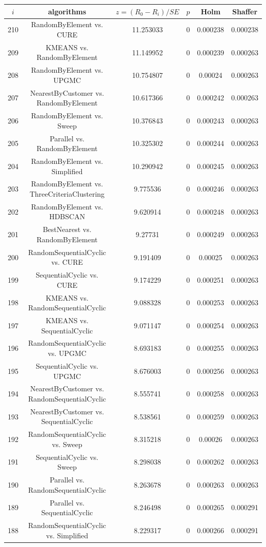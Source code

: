 \documentclass[a4paper,10pt]{article}
\begin{document}
\begin{landscape}
\begin{table}[!htp]
\centering\scriptsize
\begin{tabular}{cccccc}
$i$&algorithms&$z=(R_0 - R_i)/SE$&$p$&Holm&Shaffer\\
\hline210&RandomByElement vs. CURE&11.253033&0&0.000238&0.000238\\
209&KMEANS vs. RandomByElement&11.149952&0&0.000239&0.000263\\
208&RandomByElement vs. UPGMC&10.754807&0&0.00024&0.000263\\
207&NearestByCustomer vs. RandomByElement&10.617366&0&0.000242&0.000263\\
206&RandomByElement vs. Sweep&10.376843&0&0.000243&0.000263\\
205&Parallel vs. RandomByElement&10.325302&0&0.000244&0.000263\\
204&RandomByElement vs. Simplified&10.290942&0&0.000245&0.000263\\
203&RandomByElement vs. ThreeCriteriaClustering&9.775536&0&0.000246&0.000263\\
202&RandomByElement vs. HDBSCAN&9.620914&0&0.000248&0.000263\\
201&BestNearest vs. RandomByElement&9.27731&0&0.000249&0.000263\\
200&RandomSequentialCyclic vs. CURE&9.191409&0&0.00025&0.000263\\
199&SequentialCyclic vs. CURE&9.174229&0&0.000251&0.000263\\
198&KMEANS vs. RandomSequentialCyclic&9.088328&0&0.000253&0.000263\\
197&KMEANS vs. SequentialCyclic&9.071147&0&0.000254&0.000263\\
196&RandomSequentialCyclic vs. UPGMC&8.693183&0&0.000255&0.000263\\
195&SequentialCyclic vs. UPGMC&8.676003&0&0.000256&0.000263\\
194&NearestByCustomer vs. RandomSequentialCyclic&8.555741&0&0.000258&0.000263\\
193&NearestByCustomer vs. SequentialCyclic&8.538561&0&0.000259&0.000263\\
192&RandomSequentialCyclic vs. Sweep&8.315218&0&0.00026&0.000263\\
191&SequentialCyclic vs. Sweep&8.298038&0&0.000262&0.000263\\
190&Parallel vs. RandomSequentialCyclic&8.263678&0&0.000263&0.000263\\
189&Parallel vs. SequentialCyclic&8.246498&0&0.000265&0.000291\\
188&RandomSequentialCyclic vs. Simplified&8.229317&0&0.000266&0.000291\\

\end{tabular}
\end{table}
\end{landscape}
\end{document}
